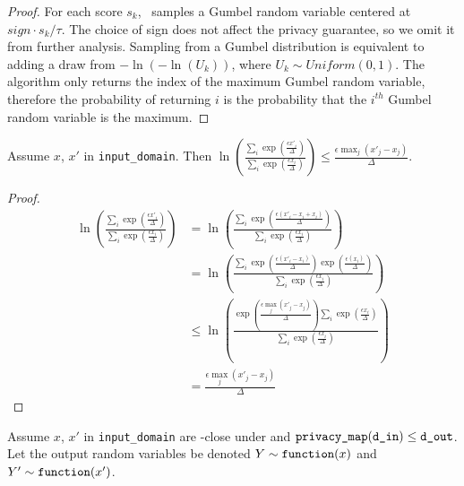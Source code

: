 \documentclass{article}
\begin{document}
\begin{proof}
    For each score $s_k$, \function\ samples a Gumbel random variable centered at $sign \cdot s_k / \tau$.
    The choice of sign does not affect the privacy guarantee, so we omit it from further analysis.
    Sampling from a Gumbel distribution is equivalent to adding a draw from $-\ln(-\ln(U_k))$, where $U_k \sim Uniform(0, 1)$.
    The algorithm only returns the index of the maximum Gumbel random variable,
    therefore the probability of returning $i$ is the probability that the $i^{th}$ Gumbel random variable is the maximum.
\end{proof}

\begin{lemma}
    \label{priv-inequality}
    Assume $x$, $x'$ in \texttt{input\_domain}. Then
    $\ln\left(\frac{\sum_{i} \exp(\frac{\epsilon x'_i}{\Delta})}{\sum_{i} \exp(\frac{\epsilon x_i}{\Delta})}\right) \le \frac{\epsilon \max_j (x'_j - x_j)}{\Delta}$.
\end{lemma}

\begin{proof}
\begin{align*}
    \ln\left(\frac{\sum_{i} \exp(\frac{\epsilon x'_i}{\Delta})}{\sum_{i} \exp(\frac{\epsilon x_i}{\Delta})}\right)
    &= \ln\left(\frac{\sum_{i} \exp(\frac{\epsilon (x'_i - x_i + x_i)}{\Delta})}{\sum_{i} \exp(\frac{\epsilon x_i}{\Delta})}\right) \\
    &= \ln\left(\frac{\sum_{i} \exp(\frac{\epsilon (x'_i - x_i)}{\Delta})\exp(\frac{\epsilon (x_i)}{\Delta})}{\sum_{i} \exp(\frac{\epsilon x_i}{\Delta})}\right) \\
    &\le \ln\left(\frac{\exp(\frac{\epsilon \max_j(x'_j - x_j)}{\Delta}) \sum_{i} \exp(\frac{\epsilon x_i}{\Delta})}{\sum_{i} \exp(\frac{\epsilon x_i}{\Delta})}\right) \\
    &= \frac{\epsilon \max_j(x'_j - x_j)}{\Delta}
\end{align*}
\end{proof}

\label{privacy-guarantee}
Assume $x$, $x'$ in \texttt{input\_domain} are \din-close under  and $\texttt{privacy\_map}(\texttt{d\_in}) \le \texttt{d\_out}$.
Let the output random variables be denoted $Y \sim \texttt{function}(x)$ and $Y' \sim \texttt{function}(x')$.
\end{document}
